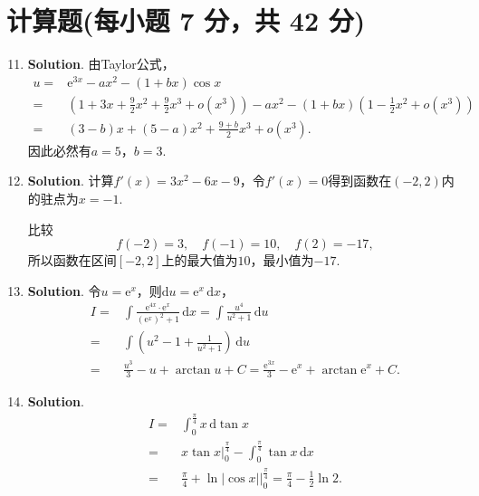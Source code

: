\documentclass[../main.tex]{subfiles}
\begin{document}
\section{计算题(每小题 7 分，共 42 分)}
\begin{enumerate}
    \setcounter{enumi}{10}
    \item \textbf{Solution}. 由Taylor公式，
          \[
              \begin{aligned}
                  u = {} & \mathrm{e}^{3x}-ax^{2}-(1+bx)\cos x                                                                                \\
                  = {}   & \left(1+3x+\frac{9}{2}x^{2}+\frac{9}{2}x^{3}+o(x^{3})\right)-ax^{2}-(1+bx)\left(1-\frac{1}{2}x^{2}+o(x^{3})\right) \\
                  = {}   & (3-b)x+(5-a)x^{2}+\frac{9+b}{2}x^{3}+o(x^{3}).
              \end{aligned}
          \]
          因此必然有$a=5$，$b=3$.

    \item \textbf{Solution}. 计算$f'(x)=3x^{2}-6x-9$，令$f'(x)=0$得到函数在$(-2,
              2)$内的驻点为$x=-1$.

          比较
          \[
              f(-2)=3,\quad f(-1)=10,\quad f(2)=-17,
          \]
          所以函数在区间$[-2,2]$上的最大值为$10$，最小值为$-17$.

    \item \textbf{Solution}. 令$u=\mathrm{e}^{x}$，则$\mathrm{d}u=\mathrm{e}
              ^{x}\,\mathrm{d}x$，
          \[
              \begin{aligned}
                  I = {} & \int \frac{\mathrm{e}^{4x}\cdot\mathrm{e}^x}{\left(\mathrm{e}^x\right)^2+1}\,\mathrm{d}x = \int \frac{u^4}{u^2+1}\,\mathrm{d}u \\
                  = {}   & \int \left(u^{2}-1+\frac{1}{u^2+1}\right)\,\mathrm{d}u                                                                         \\
                  = {}   & \frac{u^3}{3}-u+\arctan u + C = \frac{\mathrm{e}^{3x}}{3}-\mathrm{e}^{x}+\arctan\mathrm{e}^{x}+C.
              \end{aligned}
          \]

    \item \textbf{Solution}.
          \[
              \begin{aligned}
                  I = {} & \int_{0}^{\frac{\pi}{4}}x\,\mathrm{d}\tan x                                           \\
                  = {}   & x\tan x\bigg|_{0}^{\frac{\pi}{4}}-\int_{0}^{\frac{\pi}{4}}\tan x\,\mathrm{d}x         \\
                  = {}   & \frac{\pi}{4}+\ln|\cos x|\bigg|_{0}^{\frac{\pi}{4}} = \frac{\pi}{4}-\frac{1}{2}\ln 2.
              \end{aligned}
          \]


\end{enumerate}
\end{document}
